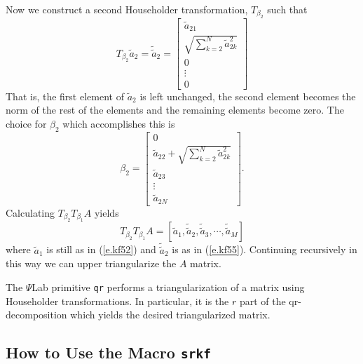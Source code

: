 	Now we construct a second Householder transformation,
$T_{\beta_2}$ such that
%
\begin{equation}
T_{\beta_2}\tilde{a}_2=\tilde{\tilde{a}}_2=
                          \left[\begin{array}{c}
                          \tilde{a}_{21}\\
                          \sqrt{\sum_{k=2}^{N}\tilde{a}_{2k}^2}\\
                          0\\
                          \vdots\\
                          0
                      \end{array}\right]
\label{e.kf55}
\end{equation}
%
That is, the first element of $\tilde{a}_2$ is left unchanged,
the second element becomes the norm of the rest of the elements and
the remaining elements become zero.  The choice for $\beta_2$ which
accomplishes this is
%
\begin{equation}
\beta_2=\left[\begin{array}{c}
                      0\\    
                      \tilde{a}_{22}+\sqrt{\sum_{k=2}^{N}\tilde{a}_{2k}^2}\\
                          \tilde{a}_{23}\\
                          \vdots\\
                          \tilde{a}_{2N}
                      \end{array}\right].
\label{e.kf56}
\end{equation}
%
Calculating $T_{\beta_2}T_{\beta_1}A$ yields
%
\begin{equation}
T_{\beta_2}T_{\beta_1}A=[\tilde{a}_1,\tilde{\tilde{a}}_2,
                                     \tilde{\tilde{a}}_3,
                                     \cdots,
                                     \tilde{\tilde{a}}_M]
\label{e.kf57}
\end{equation}
%
where $\tilde{a}_1$ is still as in (\ref{e.kf52}) and $\tilde{\tilde{a}}_2$
is as in (\ref{e.kf55}).  Continuing recursively in this way we can
upper triangularize the $A$ matrix.

	The $\Psi$Lab primitive {\tt qr} performs a triangularization of
a matrix using Householder transformations.  In particular, it is
the $r$ part of the qr-decomposition which yields the 
desired triangularized matrix.

\subsection{How to Use the Macro {\tt srkf}}

